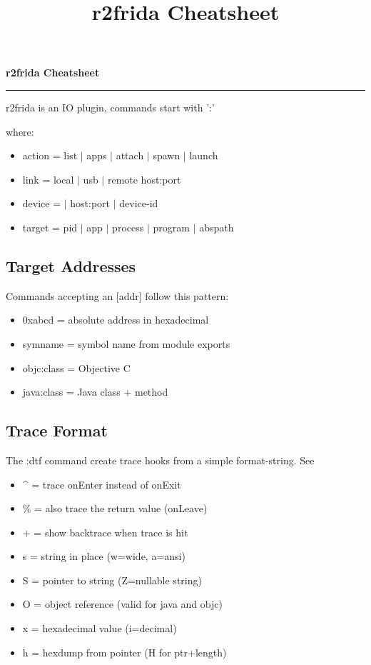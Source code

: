 \documentclass[10pt]{article}
\title{r2frida Cheatsheet}
\begin{document}
\pagestyle{r2fancy}

\begin{center}
	\Large{\bf r2frida Cheatsheet}
	\rule{\textwidth}{0.2pt}
\end{center}


\begin{multicols}{3}
\noindent
r2frida is an IO plugin, commands start with '{\ttc:}'
\begin{center}
\end{center}
where:
\begin{itemize}
	\itemsep 0em %
	\item action = list $\vert$ apps $\vert$ attach $\vert$ spawn $\vert$ launch
	\item link   = local $\vert$ usb $\vert$ remote host:port
	\item device = {\tt \textquotesingle \textquotesingle} $\vert$ host:port $\vert$ device-id
	\item target = pid $\vert$ app $\vert$ process $\vert$ program $\vert$ abspath
\end{itemize}

\subsection*{Target Addresses}
\noindent
Commands accepting an [addr] follow this pattern:
\begin{itemize}
	\itemsep 0em %
	\item 0xabcd = absolute address in hexadecimal
	\item symname = symbol name from module exports
	\item objc:class = Objective C
	\item java:class = Java class + method
\end{itemize}

\subsection*{Trace Format}
\noindent
The :dtf command create trace hooks from a simple format-string. See 
\begin{itemize}
	\itemsep 0em %
	\item \^{} = trace onEnter instead of onExit
	\item \%{} = also trace the return value (onLeave)
	\item + = show backtrace when trace is hit
	\item s = string in place (w=wide, a=ansi)
	\item S = pointer to string (Z=nullable string)
	\item O = object reference (valid for java and objc)
	\item x = hexadecimal value (i=decimal)
	\item h = hexdump from pointer (H for ptr+length)
\end{itemize}


\end{multicols}
\end{document}
